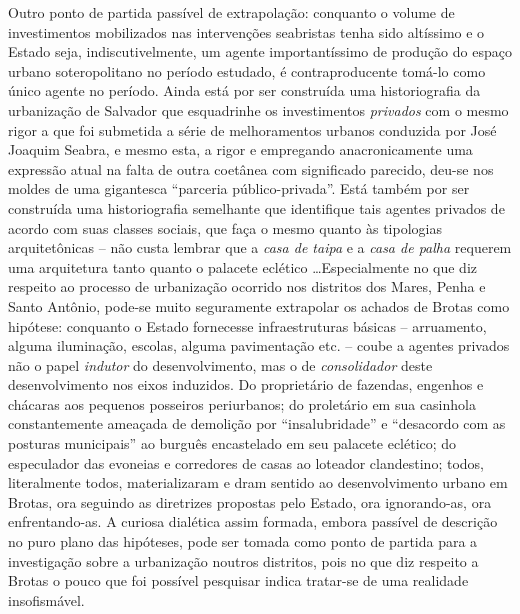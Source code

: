 Outro ponto de partida passível de extrapolação: conquanto o volume de investimentos mobilizados nas intervenções seabristas tenha sido altíssimo e o Estado seja, indiscutivelmente, um agente importantíssimo de produção do espaço urbano soteropolitano no período estudado, é contraproducente tomá-lo como único agente no período. Ainda está por ser construída uma historiografia da urbanização de Salvador que esquadrinhe os investimentos \textit{privados} com o mesmo rigor a que foi submetida a série de melhoramentos urbanos conduzida por José Joaquim Seabra, e mesmo esta, a rigor e empregando anacronicamente uma expressão atual na falta de outra coetânea com significado parecido, deu-se nos moldes de uma gigantesca ``parceria público-privada''. Está também por ser construída uma historiografia semelhante que identifique tais agentes privados de acordo com suas classes sociais, que faça o mesmo quanto às tipologias arquitetônicas -- não custa lembrar que a \textit{casa de taipa} e a \textit{casa de palha} requerem uma arquitetura tanto quanto o palacete eclético \dots Especialmente no que diz respeito ao processo de urbanização ocorrido nos distritos dos Mares, Penha e Santo Antônio, pode-se muito seguramente extrapolar os achados de Brotas como hipótese: conquanto o Estado fornecesse infraestruturas básicas -- arruamento, alguma iluminação, escolas, alguma pavimentação etc. -- coube a agentes privados não o papel \textit{indutor} do desenvolvimento, mas o de \textit{consolidador} deste desenvolvimento nos eixos induzidos. Do proprietário de fazendas, engenhos e chácaras aos pequenos posseiros periurbanos; do proletário em sua casinhola constantemente ameaçada de demolição por ``insalubridade'' e ``desacordo com as posturas municipais'' ao burguês encastelado em seu palacete eclético; do especulador das evoneias e corredores de casas ao loteador clandestino; todos, literalmente todos, materializaram e dram sentido ao desenvolvimento urbano em Brotas, ora seguindo as diretrizes propostas pelo Estado, ora ignorando-as, ora enfrentando-as. A curiosa dialética assim formada, embora passível de descrição no puro plano das hipóteses, pode ser tomada como ponto de partida para a investigação sobre a urbanização noutros distritos, pois no que diz respeito a Brotas o pouco que foi possível pesquisar indica tratar-se de uma realidade insofismável.

